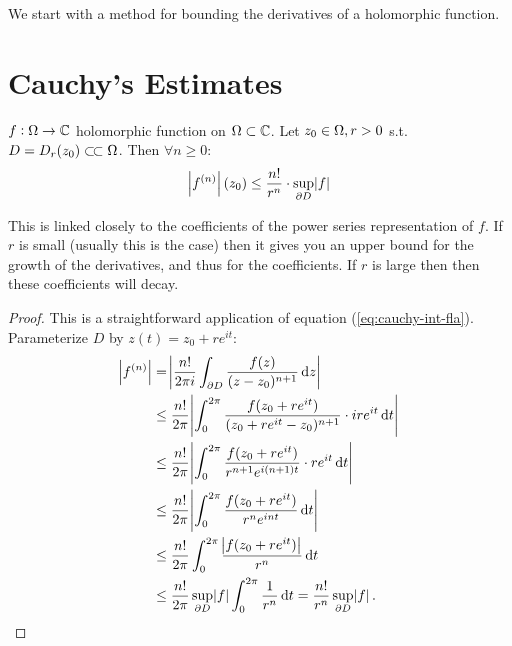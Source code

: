 \setcounter{section}{0}
\setcounter{theorem}{0}


We start with a method for bounding the derivatives of a holomorphic function.

\section{Cauchy's Estimates}



\begin{theorem}\label{thm:cauchy-estimates}

$f:\Omega \rightarrow \mathbb{C}$ holomorphic function on $\Omega \subset \mathbb{C}$. Let $z_0 \in \Omega, r>0 $ s.t. $D=D_r(z_0) \ssubset \om$. Then $\forall n\geq 0$:  
\begin{align*}
    \abs{f^{(n)}}(z_0) \leq \frac{n!}{r^n} \cdot \sup_{\partial D}\abs{f}
\end{align*}

\end{theorem}


\begin{note}
This is linked closely to the coefficients of the power series representation of $f$. If $r$ is small (usually this is the case) then it gives you an upper bound for the growth of the derivatives, and thus for the coefficients. If $r$ is large then then these coefficients will decay.
\end{note}


\begin{proof}
This is a straightforward application of equation (\ref{eq:cauchy-int-fla}). Parameterize $D$ by $z(t) = z_0 +re^{it}$:
\begin{align*}
    \abs{f^{(n)}} &= \abs{\frac{n!}{2\pi i} \int_{\partial D} \frac{f(z)}{(z-z_0)^{n+1}} \dif z }\\
    &\leq \frac{n!}{2\pi} \abs{\int_{0}^{2\pi} \frac{f(z_0 +re^{it})}{(z_0 +re^{it}-z_0)^{n+1}} \cdot i r e^{it} \dif t }\\
    &\leq \frac{n!}{2\pi} \abs{\int_{0}^{2\pi} \frac{f(z_0 +re^{it})}{r^{n+1}e^{i(n+1)t}} \cdot r e^{it} \dif t }\\
    &\leq  \frac{n!}{2\pi} \abs{\int_{0}^{2\pi} \frac{f(z_0 +re^{it})}{r^{n}e^{int}} \dif t }\\
    &\leq \frac{n!}{2\pi} \int_{0}^{2\pi}  \frac{\abs{ f(z_0 +re^{it})  }}{r^{n}} \dif t \\
    &\leq \frac{n!}{2\pi} \sup_{\partial D}\abs{f} \int_{0}^{2\pi}  \frac{1}{r^{n}} \dif t  = \frac{n!}{r^n} \sup_{\partial D}\abs{f}.
\end{align*}
\end{proof}

